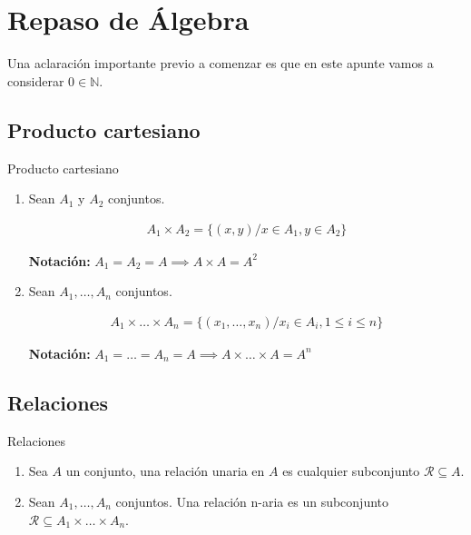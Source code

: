 \chapter{Repaso de Álgebra}
\graphicspath{ {./teoria/resources/repaso/} }

Una aclaración importante previo a comenzar es que en este apunte vamos a 
considerar $0 \in \mathbb{N}$.

\section{Producto cartesiano}

\begin{definicion}{Producto cartesiano}{}
    \begin{enumerate}
    
        \item Sean $A_1$ y $A_2$ conjuntos.
    
        \begin{gather*}
            A_1 \times A_2 = \{ (x,y) / x \in A_1, y \in A_2 \} 
        \end{gather*}
    
        \bigskip
        \textbf{Notación:} $A_1 = A_2 = A \implies A \times A = A^2$
    
        \item Sean $A_1, \dotsc, A_n$ conjuntos.
    
        \begin{gather*}
            A_1 \times \dots \times A_n 
                = \{ (x_1, \dotsc, x_n) / x_i \in A_i, 1 \leq i \leq n \}
        \end{gather*}
    
        \bigskip
        \textbf{Notación:} 
        $A_1 = \dots = A_n = A \implies A \times \dots \times A = A^n$
    
    \end{enumerate}
\end{definicion}

\section{Relaciones}

\begin{definicion}{Relaciones}{}
    \begin{enumerate}
        \item Sea $A$ un conjunto, una relación unaria en $A$ es cualquier 
            subconjunto $\mathcal{R} \subseteq A$.
    
        
        \item Sean $A_1 , \dotsc , A_n$ conjuntos. Una relación n-aria es un 
            subconjunto $\mathcal{R}\subseteq A_1 \times \dots \times A_n$.
    
    \end{enumerate}
\end{definicion}

